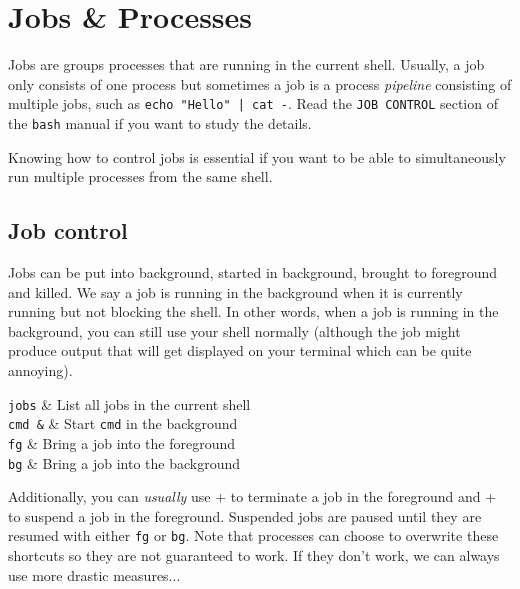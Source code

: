 \documentclass{TheAlternativeCourse}
\begin{document}
	
\section{Jobs \& Processes}

Jobs are groups processes that are running in the current shell. Usually, a job only consists of one process but sometimes a job is a process \emph{pipeline} consisting of multiple jobs, such as \texttt{echo "Hello" | cat -}. Read the \texttt{JOB CONTROL} section of the \texttt{bash} manual if you want to study the details.

Knowing how to control jobs is essential if you want to be able to simultaneously run multiple processes from the same shell.

\subsection{Job control}

Jobs can be put into background, started in background, brought to foreground and killed. We say a job is running in the background when it is currently running but not blocking the shell. In other words, when a job is running in the background, you can still use your shell normally (although the job might produce output that will get displayed on your terminal which can be quite annoying).

\begin{table}[H]
    \centering
    \begin{tcolorbox}[%
        enhanced,
        fuzzy shadow={1mm}{-1mm}{0mm}{0.1mm}{black!50!white},
        width=1.0\linewidth,
        tabularx={>{\centering\arraybackslash}l|>{\centering\arraybackslash}X},
        title={Working with jobs}]
	    \texttt{jobs} & List all jobs in the current shell\\
	    \texttt{cmd \&} & Start \texttt{cmd} in the background\\
	    \texttt{fg} & Bring a job into the foreground\\
	    \texttt{bg} & Bring a job into the background\\
    \end{tcolorbox}
    \label{tab7}
\end{table}
%
Additionally, you can \emph{usually} use \keys{\ctrl}+ to terminate a job in the foreground and \keys{\ctrl}+ to suspend a job in the foreground. Suspended jobs are paused until they are resumed with either \texttt{fg} or \texttt{bg}. Note that processes can choose to overwrite these shortcuts so they are not guaranteed to work. If they don't work, we can always use more drastic measures...
\end{document}
